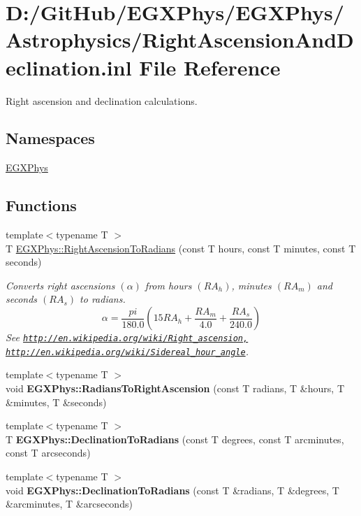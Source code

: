 \hypertarget{_right_ascension_and_declination_8inl}{}\section{D\+:/\+Git\+Hub/\+E\+G\+X\+Phys/\+E\+G\+X\+Phys/\+Astrophysics/\+Right\+Ascension\+And\+Declination.inl File Reference}
\label{_right_ascension_and_declination_8inl}


Right ascension and declination calculations.  


\subsection*{Namespaces}
\begin{DoxyCompactItemize}
\item 
 \mbox{\hyperlink{namespace_e_g_x_phys}{E\+G\+X\+Phys}}
\end{DoxyCompactItemize}
\subsection*{Functions}
\begin{DoxyCompactItemize}
\item 
{\footnotesize template$<$typename T $>$ }\\T \mbox{\hyperlink{group___right_ascension_and_declination_ga25cb93de046663967af01d6687c423ae}{E\+G\+X\+Phys\+::\+Right\+Ascension\+To\+Radians}} (const T hours, const T minutes, const T seconds)
\begin{DoxyCompactList}\small\item\em Converts right ascensions $(\alpha)$ from hours $(RA_h)$, minutes $(RA_m)$ and seconds $(RA_s)$ to radians. \[\alpha=\frac{pi}{180.0}(15 RA_h + \frac{RA_m}{4.0} + \frac{RA_s}{240.0})\] See \href{http://en.wikipedia.org/wiki/Right_ascension,}{\tt http\+://en.\+wikipedia.\+org/wiki/\+Right\+\_\+ascension,} \href{http://en.wikipedia.org/wiki/Sidereal_hour_angle}{\tt http\+://en.\+wikipedia.\+org/wiki/\+Sidereal\+\_\+hour\+\_\+angle}. \end{DoxyCompactList}\item 
{\footnotesize template$<$typename T $>$ }\\void {\bfseries E\+G\+X\+Phys\+::\+Radians\+To\+Right\+Ascension} (const T radians, T \&hours, T \&minutes, T \&seconds)
\item 
{\footnotesize template$<$typename T $>$ }\\T {\bfseries E\+G\+X\+Phys\+::\+Declination\+To\+Radians} (const T degrees, const T arcminutes, const T arcseconds)
\item 
{\footnotesize template$<$typename T $>$ }\\void {\bfseries E\+G\+X\+Phys\+::\+Declination\+To\+Radians} (const T \&radians, T \&degrees, T \&arcminutes, T \&arcseconds)
\end{DoxyCompactItemize}


